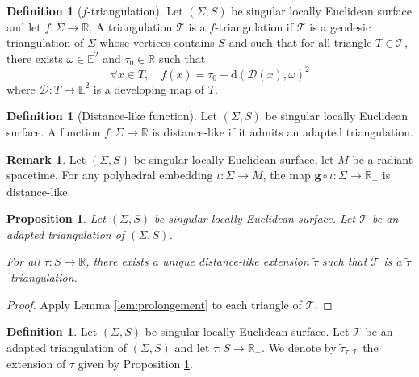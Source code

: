 \documentclass[a4paper,12pt]{article}
\def\D{\mathcal{D}}
\def\TT{\mathcal T}
\def\E{\mathbf E}
\def\d{\mathrm{d}}
\def\D{\mathcal{D}}
\def\E{\mathbb{E}}
\def\RR{\mathbb{R}}
\def\quadform{\mathbf{g}}
\def\E{\mathbb{E}}
\def\d{\mathrm{d}}
\def\D{\mathcal{D}}
\newcommand{\tautilde}[2]{\widetilde\tau_{#1,#2}}
\newtheorem{prop}[lem]{Proposition}
\theoremstyle{definition}
\newtheorem{defi}[lem]{Definition}	%
\newtheorem*{rem}{Remark}			 %
\begin{document}
                            \begin{defi}[$f$-triangulation]
                             Let $(\Sigma, S)$ be singular locally Euclidean surface and let $f:\Sigma \rightarrow \RR$. 
                             A triangulation $\TT$ is a $f$-triangulation if $\TT$ is a geodesic triangulation of $\Sigma$ whose vertices contains $S$ and such that for all triangle $T\in \TT$, there exists 
								$\omega \in \E^2$ and $\tau_0 \in \RR$ such that
								$$\forall x\in T,\quad f(x) = \tau_0-\d(\D(x),\omega)^2$$
								where $\D:T\rightarrow \E^2$ is a developing map of $T$.
                             
                            \end{defi}

							\begin{defi}[Distance-like function]
								Let $(\Sigma, S)$ be singular locally Euclidean surface. A function $f:\Sigma \rightarrow \RR$ is distance-like if it admits an adapted triangulation.
							\end{defi}

							
							\begin{rem} 
							 Let $(\Sigma, S)$ be singular locally Euclidean surface, let $M$ be a radiant spacetime. For any polyhedral embedding $\iota:\Sigma\rightarrow M$, the map $\quadform\circ \iota: \Sigma\rightarrow \RR_+$ is distance-like.
							\end{rem}

							\begin{prop}\label{prop:prolongement} 
							Let $(\Sigma, S)$ be singular locally Euclidean surface.
							Let $\TT$ be an adapted triangulation of $(\Sigma, S)$.

									For all $\tau:S\rightarrow \RR$, there exists a unique distance-like extension $\widetilde\tau$ such that $\TT$ is a $\widetilde\tau$-triangulation.
							\end{prop}
							\begin{proof} Apply Lemma \ref{lem:prolongement} to each triangle of $\TT$.
							\end{proof}
							\begin{defi} 
							Let $(\Sigma, S)$ be singular locally Euclidean surface.
							Let $\TT$ be an adapted triangulation  of $(\Sigma, S)$ and let $\tau:S\rightarrow \RR_+$. 
							We denote by
							 $\tautilde{\tau}{\TT}$ the extension of $\tau$ given by Proposition \ref{prop:prolongement}.
							 
							\end{defi}
\end{document}
